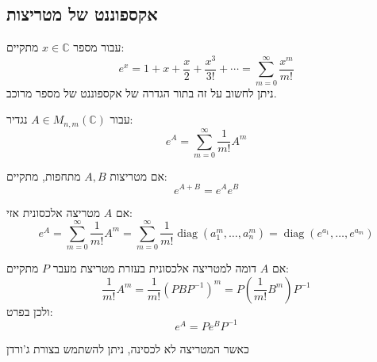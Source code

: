 \documentclass{tstextbook}
\begin{document}
\subsection{אקספוננט של מטריצות}

\begin{reminder}
עבור מספר \(x \in \mathbb{C}\) מתקיים:
$$e^{x}=1+x+{\frac{x}{2}}+{\frac{x^{3}}{3!}}+\cdots=\sum_{m=0}^{\infty}{\frac{x^{m}}{m!}}$$
ניתן לחשוב על זה בתור הגדרה של אקספוננט של מספר מרוכב.

\end{reminder}
\begin{definition}
עבור \(A \in M_{n,m}\left( \mathbb{C} \right)\) נגדיר:
$$e^{A}=\sum_{m=0}^{\infty}\frac{1}{m!}A^{m}$$

\end{definition}
\begin{proposition}
אם מטריצות \(A,B\) מתחפות, מתקיים:
$$e^{A+B}=e^{A}e^{B}$$

\end{proposition}
\begin{proposition}
אם \(A\) מטריצה אלכסונית אזי:
$$e^{A}=\sum_{m=0}^{\infty}{\frac{1}{m!}}A^{m}=\sum_{m=0}^{\infty}{\frac{1}{m!}}\operatorname{diag}(a_{1}^{m},\ldots,a_{n}^{m})=\operatorname{diag}(e^{a_{1}},\ldots,e^{a_{m}})$$

\end{proposition}
\begin{proposition}
אם \(A\) דומה למטריצה אלכסונית בעזרת מטריצת מעבר \(P\) מתקיים:
$${\frac{1}{m!}}A^{m}={\frac{1}{m!}}\left(P B P^{-1}\right)^{m}=P\left({\frac{1}{m!}}B^{m}\right)P^{-1}$$
ולכן בפרט:
$$e^{A}=P e^{B}P^{-1}$$

\end{proposition}
כאשר המטריצה לא לכסינה, ניתן להשתמש בצורת ג'ורדן
\end{document}

